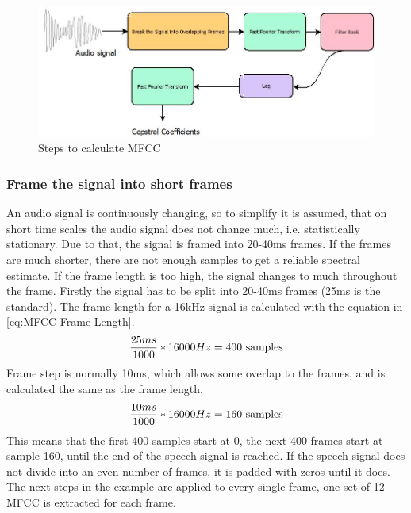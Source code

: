 \begin{figure}[htbp]
	\centering
	\includegraphics[scale=0.8]{baa-documentation/img/MFCC_Overview.jpeg}
	\caption[Steps to calculate MFCC]{Steps to calculate MFCC \footnotemark}
	\label{fig:MFCC-Overview}
\end{figure}

\subsubsection{Frame the signal into short frames}
An audio signal is continuously changing, so to simplify it is assumed, that on short time scales the audio signal does not change much, i.e. statistically stationary. Due to that, the signal is framed into 20-40ms frames. If the frames are much shorter, there are not enough samples to get a reliable spectral estimate. If the frame length is too high, the signal changes to much throughout the frame.
\newline 
\newline
Firstly the signal has to be split into 20-40ms frames (25ms is the standard). The frame length for a 16kHz signal is calculated with the equation in \ref{eq:MFCC-Frame-Length}. 
\begin{equation}
    \centering
    \frac{25ms}{1000} * 16000Hz = 400 \ \text{samples}
    \label{eq:MFCC-Frame-Length}
\end{equation}
Frame step is normally 10ms, which allows some overlap to the frames, and is calculated the same as the frame length.
\begin{equation}
    \centering
    \frac{10ms}{1000} * 16000Hz = 160 \ \text{samples}
    \label{eq:MFCC-Frame-Step}
\end{equation}
This means that the first 400 samples start at 0, the next 400 frames start at sample 160, until the end of the speech signal is reached. If the speech signal does not divide into an even number of frames, it is padded with zeros until it does. The next steps in the example are applied to every single frame, one set of 12 \gls{MFCC} is extracted for each frame.

